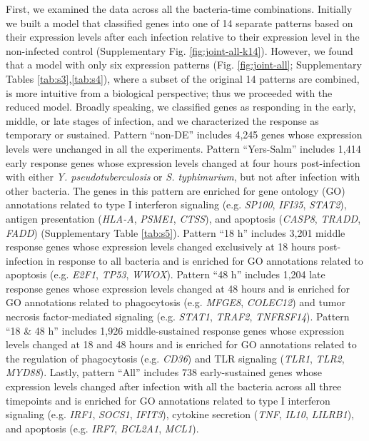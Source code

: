 First, we examined the data across all the bacteria-time combinations.
Initially we built a model that classified genes into one of 14 separate
patterns based on their expression levels after each infection relative
to their expression level in the non-infected control (Supplementary
Fig. \ref{fig:joint-all-k14}). However, we found that a model with only six expression
patterns (Fig. \ref{fig:joint-all}; Supplementary Tables \ref{tab:s3},\ref{tab:s4}), where a subset of the
original 14 patterns are combined, is more intuitive from a biological
perspective; thus we proceeded with the reduced model. Broadly speaking,
we classified genes as responding in the early, middle, or late stages
of infection, and we characterized the response as temporary or
sustained. Pattern ``non-DE'' includes 4,245 genes whose expression
levels were unchanged in all the experiments. Pattern ``Yers-Salm''
includes 1,414 early response genes whose expression levels changed at
four hours post-infection with either \emph{Y. pseudotuberculosis} or
\emph{S. typhimurium}, but not after infection with other bacteria. The
genes in this pattern are enriched for gene ontology (GO) annotations
related to type I interferon signaling (e.g. \emph{SP100}, \emph{IFI35},
\emph{STAT2}), antigen presentation (\emph{HLA-A}, \emph{PSME1},
\emph{CTSS}), and apoptosis (\emph{CASP8}, \emph{TRADD}, \emph{FADD})
(Supplementary Table \ref{tab:s5}). Pattern ``18 h'' includes 3,201 middle
response genes whose expression levels changed exclusively at 18 hours
post-infection in response to all bacteria and is enriched for GO
annotations related to apoptosis (e.g. \emph{E2F1}, \emph{TP53},
\emph{WWOX}). Pattern ``48 h'' includes 1,204 late response genes whose
expression levels changed at 48 hours and is enriched for GO annotations
related to phagocytosis (e.g. \emph{MFGE8}, \emph{COLEC12}) and tumor
necrosis factor-mediated signaling (e.g. \emph{STAT1}, \emph{TRAF2},
\emph{TNFRSF14}). Pattern ``18 \& 48 h'' includes 1,926 middle-sustained
response genes whose expression levels changed at 18 and 48 hours and is
enriched for GO annotations related to the regulation of phagocytosis
(e.g. \emph{CD36}) and TLR signaling (\emph{TLR1}, \emph{TLR2},
\emph{MYD88}). Lastly, pattern ``All'' includes 738 early-sustained
genes whose expression levels changed after infection with all the
bacteria across all three timepoints and is enriched for GO annotations
related to type I interferon signaling (e.g. \emph{IRF1}, \emph{SOCS1},
\emph{IFIT3}), cytokine secretion (\emph{TNF}, \emph{IL10},
\emph{LILRB1}), and apoptosis (e.g. \emph{IRF7}, \emph{BCL2A1},
\emph{MCL1}).

